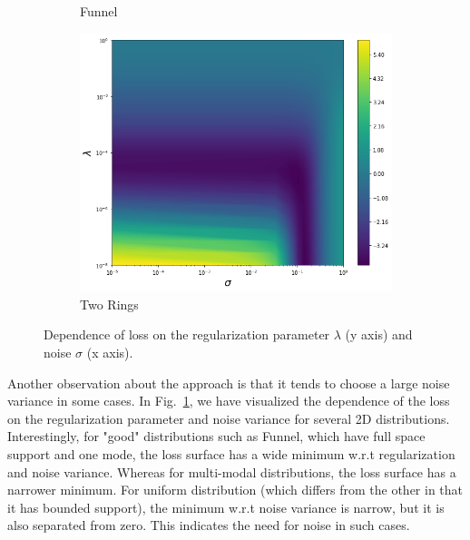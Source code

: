 \begin{figure}[!ht]
\begin{subfigure}[b]{0.32\textwidth}
    \caption{Funnel}
  \end{subfigure}
  \begin{subfigure}[b]{0.32\textwidth}
    \includegraphics[width=\textwidth]{figures/score_matching/loss/lossRings.png}
    \caption{Two Rings}
  \end{subfigure}
  \caption{Dependence of loss on the regularization parameter $\lambda$ (y axis) and noise $\sigma$ (x axis).}
  \label{fig:lossdemo}
\end{figure}
Another observation about the approach is that it tends to choose
a large noise variance in some cases.
In Fig.~\ref{fig:lossdemo}, we have visualized the dependence of the loss on
the regularization parameter and noise variance for several 2D distributions.
Interestingly, for "good" distributions
such as Funnel, which have full space support and one mode, the loss surface has a wide
minimum w.r.t regularization and noise variance.
Whereas for multi-modal distributions, the loss surface has a narrower minimum.
For uniform distribution (which differs from the other in that it has bounded support),
the minimum w.r.t noise variance is narrow, but it is also separated from zero.
This indicates the need for noise in such cases.



